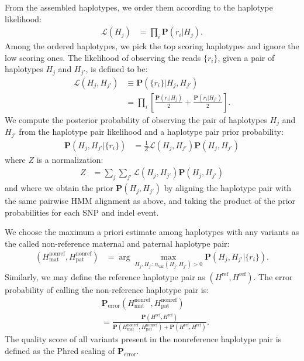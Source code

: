 \documentclass{acm_proc_article-sp}
\begin{document}
From the assembled haplotypes, we order them according to the haplotype
likelihood:
\begin{align}
  \mathcal L(H_j)
  &=\prod_i\mathbf P(r_i|H_j).
\end{align}
Among the ordered haplotypes, we pick the top scoring haplotypes and ignore
the low scoring ones.
The likelihood of observing the reads $\{r_i\}$, given a pair of haplotypes
$H_j$ and $H_{j'}$, is defined to be: %
\begin{align}
  \mathcal L(H_j,H_{j'})
  &\equiv\mathbf P(\{r_i\}|H_j,H_{j'}) \\ \nonumber
  &=\prod_i\left[ \frac{\mathbf P(r_i|H_j) }{2} + \frac{\mathbf P(r_i|H_{j'})}{2} \right].
\end{align}
We compute the posterior probability of observing the pair of haplotypes
$H_j$ and $H_{j'}$ from the haplotype pair likelihood and a haplotype pair
prior probability:
\begin{align}
  \mathbf P (H_j,H_{j'}|\{r_i\})&=\frac{1}{Z}\mathcal L(H_j,H_{j'})\mathbf P(H_j,H_{j'})
\end{align}
where $Z$ is a normalization:
\begin{align*}
  Z&=\sum_j\sum_{j'}\mathcal L(H_j,H_{j'})\mathbf P(H_j,H_{j'})
\end{align*}
and where we obtain the prior $\mathbf P (H_j,H_{j'})$ by aligning the haplotype
pair with the same pairwise HMM alignment as above, and taking the product of
the prior probabilities for each SNP and indel event. %

We choose the maximum a priori estimate among haplotypes with any variants
as the called non-reference maternal and paternal haplotype pair:
\begin{align}
  (H_\text{mat}^\text{nonref},H_\text{pat}^\text{nonref})&=\arg\max_{H_j,H_{j'}:n_\text{var}(H_j,H_{j'})>0}\mathbf P(H_j,H_{j'}|\{r_i\}).
\end{align}
Similarly, we may define the reference haplotype pair as
$(H^\text{ref},H^\text{ref})$.
The error probability of calling the non-reference haplotype pair is:
\begin{align}
  &\mathbf P_\text{error}(H_\text{mat}^\text{nonref},H_\text{pat}^\text{nonref}) \\ \nonumber
  &=\frac{\mathbf P(H^\text{ref},H^\text{ref})}{\mathbf P(H_\text{mat}^\text{nonref},H_\text{pat}^\text{nonref})+\mathbf P(H^\text{ref},H^\text{ref})}.
\end{align}
The quality score of all variants present in the nonreference haplotype pair
is defined as the Phred scaling of $\mathbf P_\text{error}$.
\end{document}
